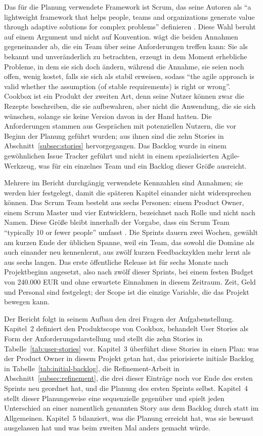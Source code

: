 Das für die Planung verwendete Framework ist Scrum, das seine Autoren als \enquote{a lightweight framework that helps people, teams and organizations generate value through adaptive solutions for complex problems} definieren \parencite[p.~3]{scrumguide2020}. Diese Wahl beruht auf einem Argument und nicht auf Konvention. \textcite[ch.~4, pp.~31--38]{kelly2019} wägt die beiden Annahmen gegeneinander ab, die ein Team über seine Anforderungen treffen kann: Sie als bekannt und unveränderlich zu betrachten, erzeugt in dem Moment erhebliche Probleme, in dem sie sich doch ändern, während die Annahme, sie seien noch offen, wenig kostet, falls sie sich als stabil erweisen, sodass \enquote{the agile approach is valid whether the assumption (of stable requirements) is right or wrong}. Cookbox ist ein Produkt der zweiten Art, denn seine Nutzer können zwar die Rezepte beschreiben, die sie aufbewahren, aber nicht die Anwendung, die sie sich wünschen, solange sie keine Version davon in der Hand hatten. Die Anforderungen stammen aus Gesprächen mit potenziellen Nutzern, die vor Beginn der Planung geführt wurden; aus ihnen sind die zehn Stories in Abschnitt~\ref{subsec:stories} hervorgegangen. Das Backlog wurde in einem gewöhnlichen Issue Tracker geführt und nicht in einem spezialisierten Agile-Werkzeug, was für ein einzelnes Team und ein Backlog dieser Größe ausreicht.

Mehrere im Bericht durchgängig verwendete Kennzahlen sind Annahmen; sie werden hier festgelegt, damit die späteren Kapitel einander nicht widersprechen können. Das Scrum Team besteht aus sechs Personen: einem Product Owner, einem Scrum Master und vier Entwicklern, bezeichnet nach Rolle und nicht nach Namen. Diese Größe bleibt innerhalb der Vorgabe, dass ein Scrum Team \enquote{typically 10 or fewer people} umfasst \parencite[p.~5]{scrumguide2020}. Die Sprints dauern zwei Wochen, gewählt am kurzen Ende der üblichen Spanne, weil ein Team, das sowohl die Domäne als auch einander neu kennenlernt, aus zwölf kurzen Feedbackzyklen mehr lernt als aus sechs langen. Das erste öffentliche Release ist für sechs Monate nach Projektbeginn angesetzt, also nach zwölf dieser Sprints, bei einem festen Budget von 240.000 EUR und ohne erwartete Einnahmen in diesem Zeitraum. Zeit, Geld und Personal sind festgelegt; der Scope ist die einzige Variable, die das Projekt bewegen kann.

Der Bericht folgt in seinem Aufbau den drei Fragen der Aufgabenstellung. Kapitel~2 definiert den Produktscope von Cookbox, behandelt User Stories als Form der Anforderungsdarstellung und stellt die zehn Stories in Tabelle~\ref{tab:user-stories} vor. Kapitel~3 überführt diese Stories in einen Plan: was der Product Owner in diesem Projekt getan hat, das priorisierte initiale Backlog in Tabelle~\ref{tab:initial-backlog}, die Refinement-Arbeit in Abschnitt~\ref{subsec:refinement}, die drei dieser Einträge noch vor Ende des ersten Sprints neu geordnet hat, und die Planung des ersten Sprints selbst. Kapitel~4 stellt dieser Planungsweise eine sequenzielle gegenüber und spielt jeden Unterschied an einer namentlich genannten Story aus dem Backlog durch statt im Allgemeinen. Kapitel~5 bilanziert, was die Planung erreicht hat, was sie bewusst ausgelassen hat und was beim zweiten Mal anders gemacht würde.


